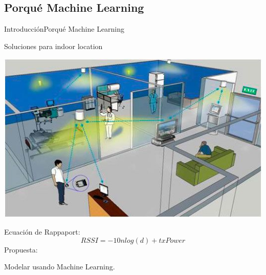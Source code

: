 \documentclass[10pt]{beamer}
\begin{document}
\subsection{Porqué Machine Learning}
\begin{frame}{Introducción}{Porqué Machine Learning}
\begin{block}{Soluciones para indoor location}
\begin{center}
\includegraphics[scale=0.3]{AAUgraphics/ips}
\end{center}
Ecuación de Rappaport:
$$RSSI = -10 n log(d) + txPower$$
Propuesta:\\
\begin{center}
Modelar usando Machine Learning.
\end{center}
\end{block}
\end{frame}
\end{document}
